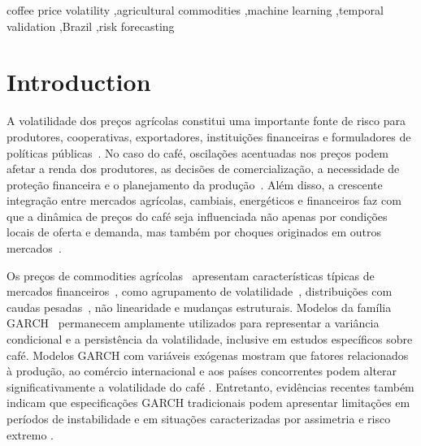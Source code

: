 \documentclass[a4paper,fleqn]{cas-sc}
\begin{document}
\begin{keywords}
coffee price volatility \sep agricultural commodities \sep machine learning \sep temporal validation \sep Brazil \sep risk forecasting
\end{keywords}

\maketitle

\section{Introduction}
\label{sec:introduction}

A volatilidade dos preços agrícolas constitui uma importante fonte de risco para produtores, cooperativas, exportadores, instituições financeiras e formuladores de políticas públicas~\citep{Manogna2025HybridVolatility,Brun2026GARCHCoffeeRisk}. No caso do café, oscilações acentuadas nos preços podem afetar a renda dos produtores, as decisões de comercialização, a necessidade de proteção financeira e o planejamento da produção~\citep{Zhang2025ClimateRealizedVolatility,Chaovanapoonphol2023CoffeeGARCHX,Fahmi2023LocalCoffeePolicy}. Além disso, a crescente integração entre mercados agrícolas, cambiais, energéticos e financeiros faz com que a dinâmica de preços do café seja influenciada não apenas por condições locais de oferta e demanda, mas também por choques originados em outros mercados~\citep{Nassani2025FinancialIntegration,manogna2025dynamicnexus}.

Os preços de commodities agrícolas~\citep{hamulczuk2026price,Manogna2025HybridVolatility,Jin2026,kupabado2025price,martin2015finance} apresentam características típicas de mercados financeiros~\citep{105033937791}, como agrupamento de volatilidade~\citep{S259000562600007X}, distribuições com caudas pesadas~\citep{S0957417426013771}, não linearidade e mudanças estruturais. Modelos da família GARCH~\citep{S0165188925000946,105013192554,105027925489} permanecem amplamente utilizados para representar a variância condicional e a persistência da volatilidade, inclusive em estudos específicos sobre café. Modelos GARCH com variáveis exógenas mostram que fatores relacionados à produção, ao comércio internacional e aos países concorrentes podem alterar significativamente a volatilidade do café \citep{Chaovanapoonphol2023CoffeeGARCHX}. Entretanto, evidências recentes também indicam que especificações GARCH tradicionais podem apresentar limitações em períodos de instabilidade e em situações caracterizadas por assimetria e risco extremo \citep{Brun2026GARCHCoffeeRisk}.
\end{document}
